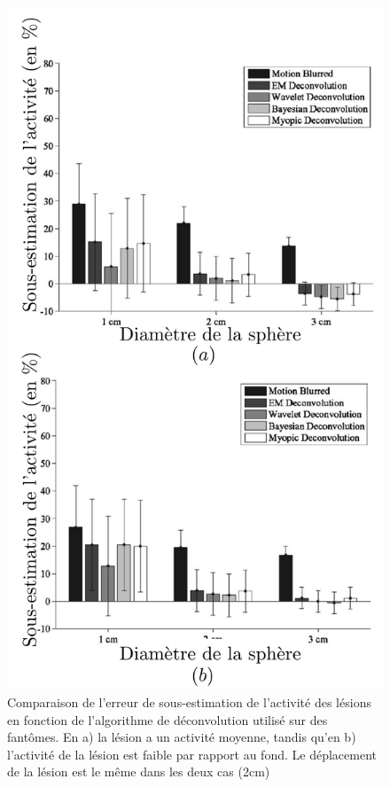 \begin{figure}[h!]
	\begin{center}
		\includegraphics[width=12cm]{images/performanceDeconvolution}
	\end{center}
	\caption{Comparaison de l'erreur de sous-estimation de l'activité des lésions en fonction de l'algorithme de déconvolution utilisé sur des fantômes. En a) la lésion a un activité moyenne, tandis qu'en b) l'activité de la lésion est faible par rapport au fond. Le déplacement de la lésion est le même dans les deux cas (2cm)} 
	\label{fig:performanceDeconvolution}
\end{figure}
